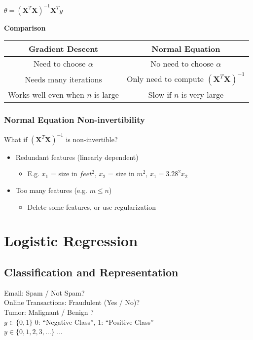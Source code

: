 \documentclass{article}
\newcommand{\vect}[1]{\boldsymbol{#1}}
\begin{document}
$\theta = (\vect{X}^T\vect{X})^{-1}\vect{X}^Ty$ \\


\begin{center}
\textbf{Comparison} \\
\begin{tabular}{ |c c | }
\hline
Gradient Descent & Normal Equation \\ 
\hline
Need to choose $\alpha$ & No need to choose $\alpha$ \\  
\hline
Needs many iterations & Only need to compute $(\vect{X}^T\vect{X})^{-1}$ \\
\hline
Works well even when $n$ is large & Slow if $n$ is very large \\
\hline
\end{tabular}
\end{center}

\subsubsection{Normal Equation Non-invertibility}
What if $(\vect{X}^T\vect{X})^{-1}$ is non-invertible?
\begin{itemize}
  \item Redundant features (linearly dependent)
  \begin{itemize}
    \item E.g. $x_1$ = size in $feet^2$, $x_2$ = size in $m^2$, $x_1 = 3.28^2 x_2$
  \end{itemize}
  \item Too many features (e.g. $m \le n$)
  \begin{itemize}
    \item Delete some features, or use regularization
  \end{itemize}
\end{itemize}

\section{Logistic Regression}
\subsection{Classification and Representation}
Email: Spam / Not Spam? \\
Online Transactions: Fraudulent (Yes / No)? \\
Tumor: Malignant / Benign ? \\

$y \in \{0, 1\}$ 0: ``Negative Class'', 1: ``Positive Class''\\
$y \in \{0, 1, 2, 3, ...\}$ ...\\
\end{document}
